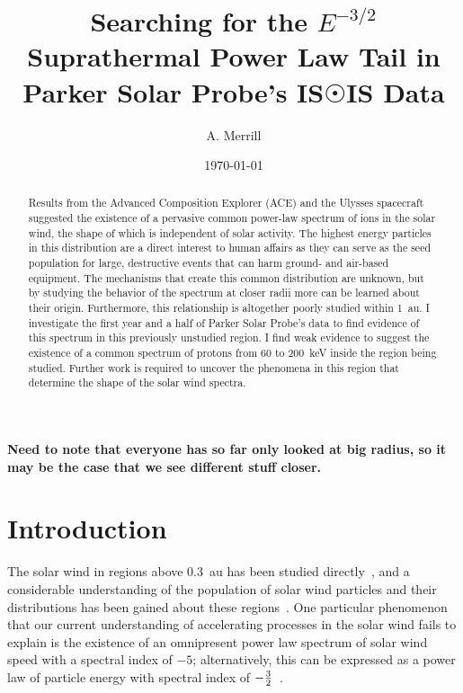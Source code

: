 \documentclass[letterpaper,11pt]{article}
\begin{document}
\title{Searching for the $E^{-3/2}$ Suprathermal Power Law Tail in Parker Solar Probe's IS$\Sun$IS Data}
\author{A. Merrill}
\date{\today}
\maketitle

\linenumbers

\begin{abstract}
Results from the Advanced Composition Explorer (ACE) and the Ulysses spacecraft suggested the existence of a pervasive common power-law spectrum of ions in the solar wind, the shape of which is independent of solar activity.  The highest energy particles in this distribution are a direct interest to human affairs as they can serve as the seed population for large, destructive events that can harm ground- and air-based equipment.  The mechanisms that create this common distribution are unknown, but by studying the behavior of the spectrum  at  closer  radii  more  can  be  learned  about  their  origin.  Furthermore, this relationship is altogether poorly studied within \SI{1}{\astronomicalunit}.  I investigate the first year and a half of Parker Solar Probe's data to find evidence of this spectrum in this previously unstudied region. I find weak evidence to suggest the existence of a common spectrum of protons from 60 to \SI{200}{\kilo\electronvolt} inside the region being studied.  Further work is required to uncover the phenomena  in  this  region  that  determine  the  shape  of  the  solar  wind spectra.
\end{abstract}

\textbf{Need to note that everyone has so far only looked at big radius, so it may be the case that we see different stuff closer.}

\section{Introduction}
\label{sec:intro}
The solar wind in regions above \SI{0.3}{\astronomicalunit} has been studied directly~\citep{McComas2007}, and a considerable understanding of the population of solar wind particles and their distributions has been gained about these regions~\citep{Giacalone2002,Fisk2012,Fisk2006,Fisk2008,Gloeckler2000}.  One particular phenomenon that our current understanding of accelerating processes in the solar wind fails to explain is the existence of an omnipresent power law spectrum of solar wind speed with a spectral index of $-5$; alternatively, this can be expressed as a power law of particle energy with spectral index of $-{3 \over 2}$~\citep{Fisk2012}.
\end{document}
